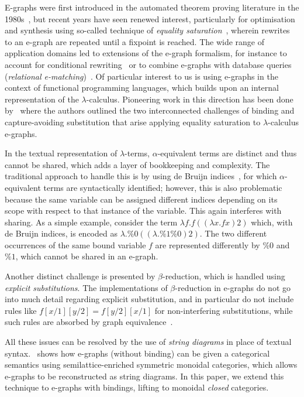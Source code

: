 \documentclass[]{IEEEtran}
\begin{document}
E-graphs were first introduced in the automated theorem proving literature in the 1980s~\cite{nelson1980techniques}, but recent years have seen renewed interest, particularly for optimisation and synthesis using so-called technique of \emph{equality saturation}~\cite{10.1145/1594834.1480915, griggio_proceedings_2022, EggPaper,flatt_small_2022}, wherein rewrites to an e-graph are repeated until a fixpoint is reached. 
The wide range of application domains led to extensions of the e-graph formalism, for instance to account for conditional rewriting~\cite{singher2023colored} or  to combine e-graphs with database queries (\emph{relational e-matching})~\cite{zhang_relational_2022}.
Of particular interest to us is using e-graphs in the context of functional programming languages, which builds upon an internal representation of the $\lambda$-calculus. 
Pioneering work in this direction has been done by~\cite{koehler2022sketchguided} where
the authors outlined the two interconnected challenges of binding and capture-avoiding substitution that arise applying equality saturation to $\lambda$-calculus e-graphs.

In the textual representation of $\lambda$-terms, $\alpha$-equivalent terms are distinct and thus cannot be shared, which adds a layer of bookkeeping and complexity.
The traditional approach to handle this is by using de Bruijn indices~\cite{de1972lambda}, for which $\alpha$-equivalent terms are syntactically identified; however, this is also problematic because the same variable can be assigned different indices depending on its scope with respect to that instance of the variable.
This again interferes with sharing. 
As a simple example, consider the term $\lambda f . f ((\lambda x . f x) 2)$ which, with de Bruijn indices,  is encoded as $\lambda . \%0 ((\lambda . \%1 \%0) 2)$.
The two different occurrences of the same bound variable $f$ are represented differently by $\%0$ and $\%1$, which cannot be shared in an e-graph.

Another distinct challenge is presented by $\beta$-reduction, which is handled using \emph{explicit substitutions}. 
The implementations of $\beta$-reduction in e-graphs do not go into much detail regarding explicit substitution, and in particular do not include rules like $f[x/1][y/2] = f[y/2][x/1]$ for non-interfering substitutions, while such rules are absorbed by graph equivalence~\cite{accattoli2014nonstandard}.

All these issues can be resolved by the use of \emph{string diagrams} in place of textual syntax.
\cite{ghica2024equivalencehypergraphsegraphsmonoidal}~shows how e-graphs (without binding) can be given a categorical semantics using semilattice-enriched symmetric monoidal categories, which allows e-graphs to be reconstructed as string diagrams.
In this paper, we extend this technique to e-graphs with bindings, lifting to monoidal \emph{closed} categories.
\end{document}
